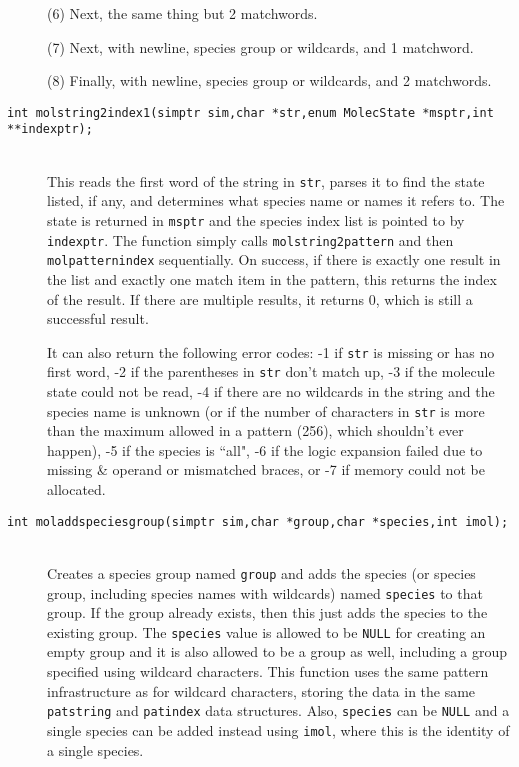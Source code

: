 \documentclass {book}
\newcommand {\ttt} {\texttt}
\begin{document}
\begin{description}
(6) Next, the same thing but 2 matchwords.

(7) Next, with newline, species group or wildcards, and 1 matchword.

(8) Finally, with newline, species group or wildcards, and 2 matchwords.

\item[\ttt{int molstring2index1(simptr sim,char *str,enum MolecState *msptr,int **indexptr);}]
\hfill \\
This reads the first word of the string in \ttt{str}, parses it to find the state listed, if any, and determines what species name or names it refers to. The state is returned in \ttt{msptr} and the species index list is pointed to by \ttt{indexptr}. The function simply calls \ttt{molstring2pattern} and then \ttt{molpatternindex} sequentially. On success, if there is exactly one result in the list and exactly one match item in the pattern, this returns the index of the result. If there are multiple results, it returns 0, which is still a successful result.

It can also return the following error codes: -1 if \ttt{str} is missing or has no first word, -2 if the parentheses in \ttt{str} don't match up, -3 if the molecule state could not be read, -4 if there are no wildcards in the string and the species name is unknown (or if the number of characters in \ttt{str} is more than the maximum allowed in a pattern (256), which shouldn't ever happen), -5 if the species is ``all", -6 if the logic expansion failed due to missing \& operand or mismatched braces, or -7 if memory could not be allocated.

\item[\ttt{int moladdspeciesgroup(simptr sim,char *group,char *species,int imol);}]
\hfill \\
Creates a species group named \ttt{group} and adds the species (or species group, including species names with wildcards) named \ttt{species} to that group. If the group already exists, then this just adds the species to the existing group. The \ttt{species} value is allowed to be \ttt{NULL} for creating an empty group and it is also allowed to be a group as well, including a group specified using wildcard characters. This function uses the same pattern infrastructure as for wildcard characters, storing the data in the same \ttt{patstring} and \ttt{patindex} data structures. Also, \ttt{species} can be \ttt{NULL} and a single species can be added instead using \ttt{imol}, where this is the identity of a single species.


\end{description}
\end{document}
